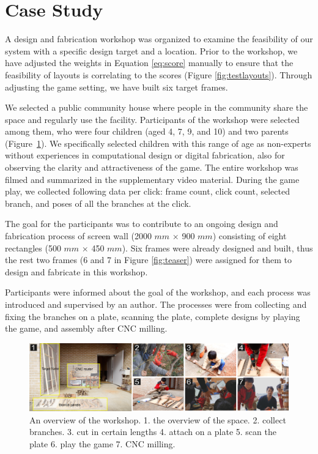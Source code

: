 \section{Case Study}
\label{sec:casestudy}
A design and fabrication workshop was organized to examine the feasibility of our system with a specific design target and a location.
Prior to the workshop, we have adjusted the weights in Equation \ref{eq:score} manually to ensure that the feasibility of layouts is correlating to the scores (Figure \ref{fig:testlayouts}). 
Through adjusting the game setting, we have built six target frames.


We selected a public community house where people in the community share the space and regularly use the facility.
Participants of the workshop were selected among them, who were four children (aged 4, 7, 9, and 10) and two parents (Figure~\ref{fig:workshop}).
We specifically selected children with this range of age as non-experts without experiences in computational design or digital fabrication, also for observing the clarity and attractiveness of the game.
The entire workshop was filmed and summarized in the supplementary video material.
During the game play, we collected following data per click: frame count, click count, selected branch, and poses of all the branches at the click.


The goal for the participants was to contribute to an ongoing design and fabrication process of screen wall (2000 $mm$ $\times$ 900 $mm$) consisting of eight rectangles (500 $mm$ $\times$ 450 $mm$).
Six frames were already designed and built, thus the rest two frames (6 and 7 in Figure \ref{fig:teaser}) were assigned for them to design and fabricate in this workshop.

Participants were informed about the goal of the workshop, and each process was introduced and supervised by an author.
The processes were from collecting and fixing the branches on a plate, scanning the plate, complete designs by playing the game, and assembly after CNC milling.

\begin{figure}[ht]
  \begin{center}
    \includegraphics[width = 0.4\paperwidth]{images/fabrication/workshop_setup.png}
    \caption{An overview of the workshop. 1. the overview of the space. 2. collect branches. 3. cut in certain lengths 4. attach on a plate 5. scan the plate 6. play the game 7. CNC milling.}
    \label{fig:workshop}
  \end{center}
\end{figure}

